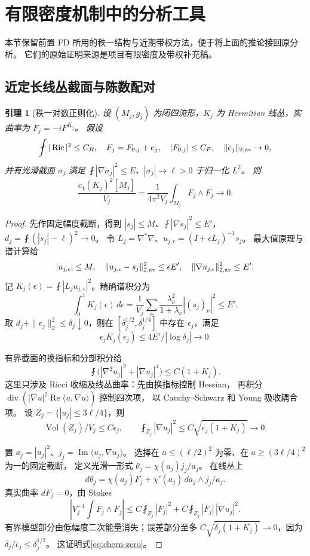 \documentclass[UTF8,11pt,a4paper,fontset=none]{ctexart}
\numberwithin{equation}{section}
\newtheorem{lemma}[theorem]{引理}
\theoremstyle{definition}
\theoremstyle{remark}\newtheorem{remark}[theorem]{说明}
\newcommand{\Ric}{\operatorname{Ric}}
\newcommand{\Vol}{\operatorname{Vol}}
\newcommand{\avint}{\fint}
\DeclareMathOperator{\Rea}{Re}
\begin{document}
\section{有限密度机制中的分析工具}\label{sec:tools}

本节保留前置 FD 所用的秩一结构与近期带权方法，便于将上面的推论接回原分析。
它们的原始证明来源是项目有限密度及带权补充稿\cite{FD,Weighted,LowAmplitude}。

\subsection{近定长线丛截面与陈数配对}
\begin{lemma}[秩一对数正则化]\label{lem:chern}
设 $(M_j,g_j)$ 为闭四流形，$K_j$ 为 Hermitian 线丛，实曲率为 $F_j=-iF^{K_j}$。
假设
\[
\avint|\Ric|^2\le C_R,\quad F_j=F_{0,j}+e_j,
\quad |F_{0,j}|\le C_F,\quad\|e_j\|_{2,\rm av}\to0,
\]
并有光滑截面 $\sigma_j$ 满足
$\avint|\nabla\sigma_j|^2\le E$、$|\sigma_j|\to\ell>0$ 于归一化 $L^2$。
则
\begin{equation}\label{eq:chern-zero}
\frac{c_1(K_j)^2[M_j]}{V_j}
=\frac1{4\pi^2V_j}\int_{M_j}F_j\wedge F_j\longrightarrow0.
\end{equation}
\end{lemma}
\begin{proof}
先作固定幅度截断，得到 $|s_j|\le M$、$\avint|\nabla s_j|^2\le E'$，
$d_j=\avint(|s_j|-\ell)^2\to0$。
令 $L_j=\nabla^*\nabla$、$u_{j,\epsilon}=(I+\epsilon L_j)^{-1}s_j$。
最大值原理与谱计算给
\[
|u_{j,\epsilon}|\le M,\quad
\|u_{j,\epsilon}-s_j\|_{2,\rm av}^2\le\epsilon E',\quad
\|\nabla u_{j,\epsilon}\|_{2,\rm av}^2\le E'.
\]
记 $K_j(\epsilon)=\avint|L_ju_{j,\epsilon}|^2$。精确谱积分为
\[
\int_0^1K_j(\epsilon)\,d\epsilon
=\frac1{V_j}\sum_\nu\frac{\lambda_\nu^2}{1+\lambda_\nu}|(s_j)_\nu|^2\le E'.
\]
取 $d_j+\|e_j\|_2^2\le\delta_j\downarrow0$，则在
$[\delta_j^{1/2},\delta_j^{1/4}]$ 中存在 $\epsilon_j$，满足
\[
\epsilon_jK_j(\epsilon_j)\le4E'/|\log\delta_j|\to0.
\]

有界截面的换指标和分部积分给
\[
\avint\bigl(|\nabla^2u_j|^2+|\nabla u_j|^4\bigr)\le C(1+K_j).
\]
这里只涉及 Ricci 收缩及线丛曲率：先由换指标控制 Hessian，
再积分 $\operatorname{div}(|\nabla u|^2\Rea\langle u,\nabla u\rangle)$ 控制四次项，
以 Cauchy--Schwarz 和 Young 吸收耦合项。
设 $Z_j=\{|u_j|\le3\ell/4\}$，则
\[
\Vol(Z_j)/V_j\le C\epsilon_j,\qquad
\avint_{Z_j}|\nabla u_j|^2\le C\sqrt{\epsilon_j(1+K_j)}\to0.
\]

置 $a_j=|u_j|^2$、$j_j=\operatorname{Im}\langle u_j,\nabla u_j\rangle$。
选择在 $a\le(\ell/2)^2$ 为零、在 $a\ge(3\ell/4)^2$ 为一的固定截断，
定义光滑一形式 $\theta_j=\chi(a_j)j_j/a_j$。
在线丛上
\[
d\theta_j=\chi(a_j)F_j+\chi'(a_j)\,da_j\wedge j_j/a_j.
\]
真实曲率 $dF_j=0$，由 Stokes
\[
\left|V_j^{-1}\int F_j\wedge F_j\right|
\le C\avint_{Z_j}|F_j|^2+C\avint_{Z_j}|F_j|\,|\nabla u_j|^2.
\]
有界模型部分由低幅度二次能量消失；误差部分至多
$C\sqrt{\delta_j(1+K_j)}\to0$，因为 $\delta_j/\epsilon_j\le\delta_j^{1/2}$。
这证明式\eqref{eq:chern-zero}。
\end{proof}
\end{document}
